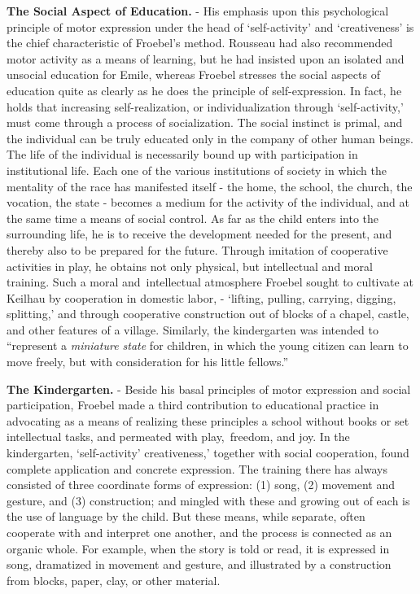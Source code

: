 \documentclass[
]{book}
\begin{document}
\textbf{The Social Aspect of Education.} - His emphasis upon this psychological principle of motor expression under the head of `self-activity' and `creativeness' is the chief characteristic of Froebel's method. Rousseau had also recommended motor activity as a means of learning, but he had insisted upon an isolated and unsocial education for Emile, whereas Froebel stresses the social aspects of education quite as clearly as he does the principle of self-expression. In fact, he holds that increasing self-realization, or individualization through `self-activity,' must come through a process of socialization. The social instinct is primal, and the individual can be truly educated only in the company of other human beings. The life of the individual is necessarily bound up with participation in institutional life. Each one of the various institutions of society in which the mentality of the race has manifested itself - the home, the school, the church, the vocation, the state - becomes a medium for the activity of the individual, and at the same time a means of social control. As far as the child enters into the surrounding life, he is to receive the development needed for the present, and thereby also to be prepared for the future. Through imitation of cooperative activities in play, he obtains not only physical, but intellectual and moral training. Such a moral and~intellectual atmosphere Froebel sought to cultivate at Keilhau by cooperation in domestic labor, - `lifting, pulling, carrying, digging, splitting,' and through cooperative construction out of blocks of a chapel, castle, and other features of a village. Similarly, the kindergarten was intended to ``represent a \emph{miniature state} for children, in which the young citizen can learn to move freely, but with consideration for his little fellows.''

\textbf{The Kindergarten.} - Beside his basal principles of motor expression and social participation, Froebel made a third contribution to educational practice in advocating as a means of realizing these principles a school without books or set intellectual tasks, and permeated with play,~freedom, and joy. In the kindergarten, `self-activity' creativeness,' together with social cooperation, found complete application and concrete expression. The training there has always consisted of three coordinate forms of expression: (1) song, (2) movement and gesture, and (3) construction; and mingled with these and growing out of each is the use of language by the child. But these means, while separate, often cooperate with and interpret one another, and the process is connected as an organic whole. For example, when the story is told or read, it is expressed in song, dramatized in movement and gesture, and illustrated by a construction from blocks, paper, clay, or other material.
\end{document}
